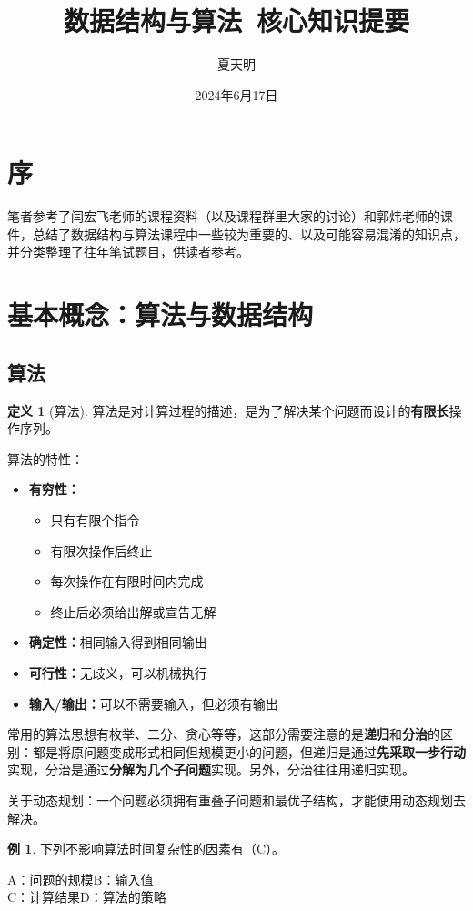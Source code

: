 \documentclass[hyperref,a4paper,UTF8,12pt]{ctexart}
\title{数据结构与算法\ 核心知识提要}
\author{夏天明}
\date{2024年6月17日}
\theoremstyle{definition}
\newtheorem{definition}[theorem]{定义}
\newtheorem{example}{例}[section]
\begin{document}
\maketitle
\tableofcontents
\setcounter{section}{-1}
\section{序}
笔者参考了闫宏飞老师的课程资料（以及课程群里大家的讨论）和郭炜老师的课件，总结了数据结构与算法课程中一些较为重要的、以及可能容易混淆的知识点，并分类整理了往年笔试题目，供读者参考。

\section{基本概念：算法与数据结构}

\subsection{算法}

\begin{definition}[算法]
算法是对计算过程的描述，是为了解决某个问题而设计的\textbf{有限长}操作序列。
\end{definition}
算法的特性：
\begin{itemize}
    \item \textbf{有穷性：}
        \begin{itemize}
            \item 只有有限个指令
            \item 有限次操作后终止
            \item 每次操作在有限时间内完成
            \item 终止后必须给出解或宣告无解
        \end{itemize}
    \item \textbf{确定性：}相同输入得到相同输出
    \item \textbf{可行性：}无歧义，可以机械执行
    \item \textbf{输入/输出：}可以不需要输入，但必须有输出
\end{itemize}
常用的算法思想有枚举、二分、贪心等等，这部分需要注意的是\textbf{递归}和\textbf{分治}的区别：都是将原问题变成形式相同但规模更小的问题，但递归是通过\textbf{先采取一步行动}实现，分治是通过\textbf{分解为几个子问题}实现。另外，分治往往用递归实现。

关于动态规划：一个问题必须拥有重叠子问题和最优子结构，才能使用动态规划去解决。

\begin{example}
    下列不影响算法时间复杂性的因素有（C）。
    
A：问题的规模\quad B：输入值\\C：计算结果\quad D：算法的策略
\end{example}
\end{document}
